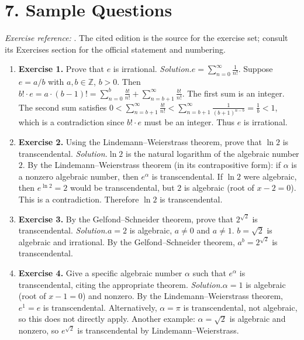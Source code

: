 \section*{7. Sample Questions}
\emph{Exercise reference:} \cite{trans_ref1}. The cited edition is the source for the exercise set; consult its Exercises section for the official statement and numbering.
\begin{enumerate}[leftmargin=*,itemsep=0.9em]
\item \textbf{Exercise 1.} Prove that $e$ is irrational. \emph{Solution.}$e = \sum_{n=0}^{\infty} \frac{1}{n!}$. Suppose $e = a/b$ with $a, b \in \mathbb{Z}$, $b > 0$. Then $b! \cdot e = a \cdot (b-1)! = \sum_{n=0}^{b} \frac{b!}{n!} + \sum_{n=b+1}^{\infty} \frac{b!}{n!}$. The first sum is an integer. The second sum satisfies $0 < \sum_{n=b+1}^{\infty} \frac{b!}{n!} < \sum_{n=b+1}^{\infty} \frac{1}{(b+1)^{n-b}} = \frac{1}{b} < 1$, which is a contradiction since $b! \cdot e$ must be an integer. Thus $e$ is irrational.

\item \textbf{Exercise 2.} Using the Lindemann--Weierstrass theorem, prove that $\ln 2$ is transcendental. \emph{Solution.}$\ln 2$ is the natural logarithm of the algebraic number $2$. By the Lindemann--Weierstrass theorem (in its contrapositive form): if $\alpha$ is a nonzero algebraic number, then $e^\alpha$ is transcendental. If $\ln 2$ were algebraic, then $e^{\ln 2} = 2$ would be transcendental, but $2$ is algebraic (root of $x - 2 = 0$). This is a contradiction. Therefore $\ln 2$ is transcendental.

\item \textbf{Exercise 3.} By the Gelfond--Schneider theorem, prove that $2^{\sqrt{2}}$ is transcendental. \emph{Solution.}$a = 2$ is algebraic, $a \neq 0$ and $a \neq 1$. $b = \sqrt{2}$ is algebraic and irrational. By the Gelfond--Schneider theorem, $a^b = 2^{\sqrt{2}}$ is transcendental.

\item \textbf{Exercise 4.} Give a specific algebraic number $\alpha$ such that $e^\alpha$ is transcendental, citing the appropriate theorem. \emph{Solution.}$\alpha = 1$ is algebraic (root of $x - 1 = 0$) and nonzero. By the Lindemann--Weierstrass theorem, $e^1 = e$ is transcendental. Alternatively, $\alpha = \pi$ is transcendental, not algebraic, so this does not directly apply. Another example: $\alpha = \sqrt{2}$ is algebraic and nonzero, so $e^{\sqrt{2}}$ is transcendental by Lindemann--Weierstrass.


\end{enumerate}
